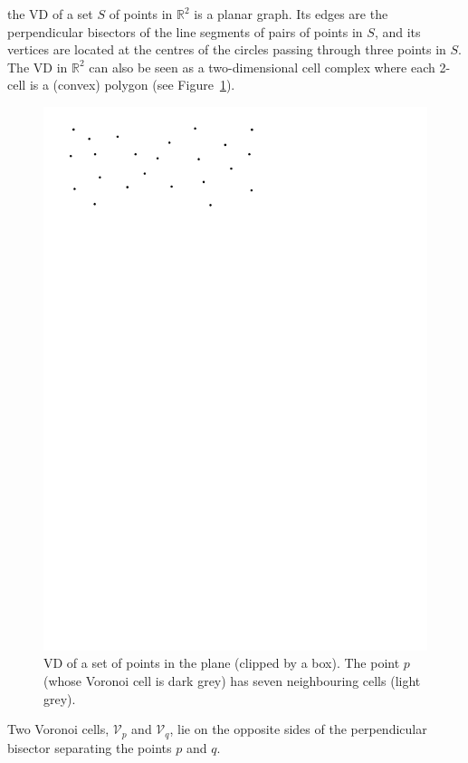 the VD of a set $S$ of points in $\mathbb{R}^2$ is a planar graph. 
Its edges are the perpendicular bisectors of the line segments of pairs of points in $S$, and its vertices are located at the centres of the circles passing through three points in $S$. 
The VD in $\mathbb{R}^2$ can also be seen as a two-dimensional cell complex where each 2-cell is a (convex) polygon (see Figure~\ref{fig:vd2d}). 
\begin{figure}
  \centering
  \includegraphics[page=3,width=\textwidth]{figs/vd2d}
  \caption{VD of a set of points in the plane (clipped by a box). The point $p$ (whose Voronoi cell is dark grey) has seven neighbouring cells (light grey).}%
\label{fig:vd2d}
\end{figure}
Two Voronoi cells, $\mathcal{V}_{p}$ and $\mathcal{V}_{q}$, lie on the opposite sides of the perpendicular bisector separating the points $p$ and $q$. 

